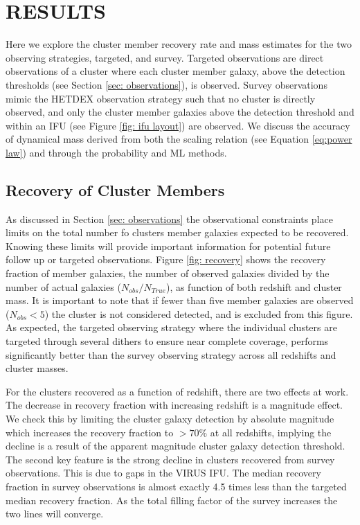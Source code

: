 \documentclass[fleqn,usenatbib]{mnras}
\begin{document}
\section{RESULTS}\label{sec:results}
Here we explore the cluster member recovery rate and mass estimates for the two observing strategies, targeted, and survey. Targeted observations are direct observations of a cluster where each cluster member galaxy, above the detection thresholds (see Section \ref{sec: observations}), is observed. Survey observations mimic the HETDEX observation strategy such that no cluster is directly observed, and only the cluster member galaxies above the detection threshold and within an IFU (see Figure \ref{fig: ifu layout}) are observed.  We discuss the accuracy of dynamical mass derived from both the scaling relation (see Equation \ref{eq:power law}) and through the probability and ML methods.

\subsection{Recovery of Cluster Members}
As discussed in Section \ref{sec: observations} the observational constraints place limits on the total number fo clusters member galaxies expected to be recovered. Knowing these limits will provide important information for potential future follow up or targeted observations. Figure \ref{fig: recovery} shows the recovery fraction of member galaxies, the number of observed galaxies divided by the number of actual galaxies ($N_{obs}/N_{True}$), as function of both redshift and cluster mass. It is important to note that if fewer than five member galaxies are observed ($N_{obs} <5$) the cluster is not considered detected, and is excluded from this figure. As expected, the targeted observing strategy where the individual clusters are targeted through several dithers to ensure near complete coverage, performs significantly better than the survey observing strategy across all redshifts and cluster masses. 

For the clusters recovered as a function of redshift, there are two effects at work. The decrease in recovery fraction with increasing redshift is a magnitude effect. We check this by limiting the cluster galaxy detection by absolute magnitude which increases the recovery fraction to $>70\%$ at all redshifts, implying the decline is a result of the apparent magnitude cluster galaxy detection threshold. The second key feature is the strong decline in clusters recovered from survey observations. This is due to gaps in the VIRUS IFU. The median recovery fraction in survey observations is almost exactly 4.5 times less than the targeted median recovery fraction. As the total filling factor of the survey increases the two lines will converge.
\end{document}
